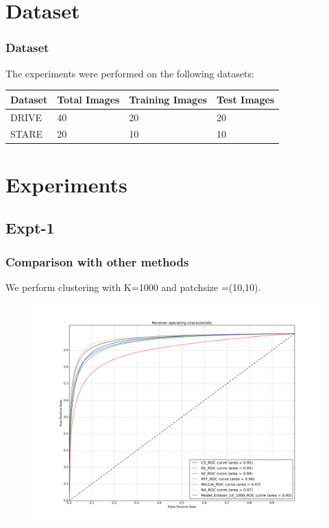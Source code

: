 \documentclass{beamer}
\begin{document}
\section{Dataset}

\begin{frame}
\frametitle{Dataset}
The experiments were performed on the following datasets:
\begin{table}
\begin{tabular}{l l l l}
\toprule
\textbf{Dataset} &  \textbf{Total Images} & \textbf{Training Images} & \textbf{Test Images}\\
\midrule
DRIVE & 40 & 20 & 20  \\
STARE & 20 & 10 & 10 \\


\bottomrule
\end{tabular}
\end{table}


\end{frame}


\section{Experiments}
\subsection{Expt-1}
\begin{frame}
\frametitle{Comparison with other methods}
We perform clustering with K=1000 and patchsize =(10,10). 
\begin{figure}
\includegraphics[width=0.8\linewidth]{Images/expt1.png}
\end{figure}
\end{frame}
\end{document}

